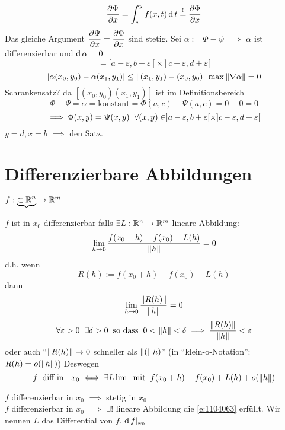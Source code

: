 \begin{Bew}
\begin{equation}
  \end{equation}
  \[\dfrac{\partial \Psi}{\partial x}=\int_c^yf(x,t)\operatorname{d} t\stackrel{!}{=}\dfrac{\partial \Phi}{\partial x}\]
  Das gleiche Argument $\dfrac{\partial \Psi}{\partial x}=\dfrac{\partial \Phi}{\partial x}$ sind stetig. Sei $\alpha:=\Phi-\psi$ $\implies$ $\alpha$ ist differenzierbar und $\operatorname{d} \alpha=0$
  \[=[a-\varepsilon, b+\varepsilon[\times ]c-\varepsilon,d+\varepsilon [\]
  \[\left| \alpha(x_0,y_0)-\alpha(x_1,y_1) \right|\leq\left\| (x_1,y_1)-(x_0,y_0) \right\|\max\left\| \nabla\alpha \right\|=0\]
  Schrankensatz? da $[(x_0,y_0)(x_1,y_1)]$ ist im Definitionsbereich
  \[\Phi-\Psi=\alpha=\text{konstant}=\Phi(a,c)-\Psi(a,c)=0-0=0\]
  \[\implies \Phi(x,y)=\Psi(x,y) \hspace{2mm}\forall (x,y)\in ]a-\varepsilon,b+\varepsilon [\times ]c-\varepsilon, d+\varepsilon [\]
  $y=d,x=b$ $\implies$ den Satz.
\end{Bew}
\section{Differenzierbare Abbildungen}
$f:\underbrace{\subset\mathbb{R}^n}\rightarrow\mathbb{R}^m$
\begin{Def}
  $f$ ist in $x_0$ differenzierbar falls $\exists L:\mathbb{R}^n\rightarrow\mathbb{R}^m$ lineare Abbildung:
  \[\displaystyle\lim_{h\rightarrow0}\frac{f(x_0+h)-f(x_0)-L(h)}{\left\| h \right\|}=0\]
  d.h. wenn 
  \[R(h):=f(x_0+h)-f(x_0)-L(h)\]
  dann
  \[\displaystyle\lim_{h\rightarrow0}\frac{\left\| R(h) \right\|}{\left\| h \right\|}=0\]
  \[\forall \varepsilon>0\hspace{2mm}\exists\delta>0\hspace{2mm}\text{so dass}\hspace{2mm}0<\left\| h \right\|<\delta\implies \frac{\left\| R(h) \right\|}{\left\| h \right\|}<\varepsilon\]
  oder auch ``$\left\| R(h) \right\|\rightarrow 0$ schneller als $\left\| ( \right\|h)$'' (in ``klein-o-Notation'': $R(h)=o(\left\| h \right\|)$) Deswegen
  \begin{equation}
    \label{e:1104063}
    f\hspace{2mm}\text{diff in }\hspace{2mm} x_0\iff \exists L \lim\hspace{2mm}\text{mit}\hspace{2mm} f(x_0+h)-f(x_0)+L(h)+o(\left\| h \right\|)
  \end{equation}
\end{Def}
\begin{Bem}
  $f$ differenzierbar in $x_0$ $\implies$ stetig in $x_0$\\
  $f$ differenzierbar in $x_0$ $\implies$ $\exists !$ lineare Abbildung die \ref{e:1104063} erfüllt. Wir nennen $L$ das Differential von $f$. $\operatorname{d} f|_{x_0}$
\end{Bem}
